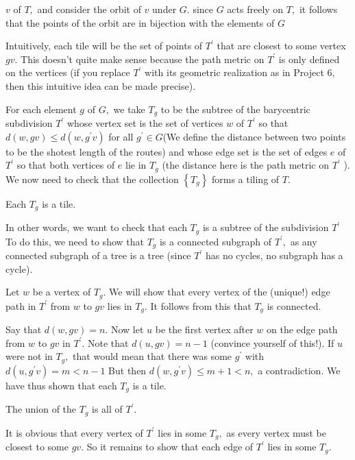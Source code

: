 $v$ of $T,$ and consider the orbit of $v$ under $G .$ since $G$ acts freely on $T,$ it follows that the points of the orbit are in bijection with the elements of $G$
\par
Intuitively, each tile will be the set of points of $T^{\prime}$ that are closest to some vertex
$g v .$ This doesn't quite make sense because the path metric on $T^{\prime}$ is only defined on the vertices (if you replace $T^{\prime}$ with its geometric realization as in Project $6,$ then this intuitive idea can be made precise).
\par
For each element $g$ of $G,$ we take $T_{g}$ to be the subtree of the barycentric subdivision $T^{\prime}$ whose vertex set is the set of vertices $w$ of $T^{\prime}$ so that $d(w, g v) \leq d\left(w, g^{\prime} v\right)$ for all $g^{\prime} \in G$(We define the distance between two points to be the shotest length of the routes) and whose edge set is the set of edges $e$ of $T^{\prime}$ so that both vertices of
$e$ lie in $T_{g}$ (the distance here is the path metric on $T^{\prime}$ ). We now need to check that the collection $\left\{T_{g}\right\}$ forms a tiling of $T$.
\begin{claim}
Each $T_{g}$ is a tile.
\end{claim}
\par
In other words, we want to check that each $T_{g}$ is a subtree of the subdivision $T^{\prime}$ To do this, we need to show that $T_{g}$ is a connected subgraph of $T^{\prime},$ as any connected subgraph of a tree is a tree (since $T^{\prime}$ has no cycles, no subgraph has a cycle).
\par
Let $w$ be a vertex of $T_{g} .$ We will show that every vertex of the (unique!) edge path in $T^{\prime}$ from $w$ to $g v$ lies in $T_{g} .$ It follows from this that $T_{g}$ is connected.
\par
Say that $d(w, g v)=n .$ Now let $u$ be the first vertex after $w$ on the edge path from
$w$ to $g v$ in $T^{\prime} .$ Note that $d(u, g v)=n-1$ (convince yourself of this!). If $u$ were not in $T_{g},$ that would mean that there was some $g^{\prime}$ with $d\left(u, g^{\prime} v\right)=m<n-1$ But then $d\left(w, g^{\prime} v\right) \leq m+1<n,$ a contradiction. We have thus shown that each $T_{g}$ is a tile.
\begin{claim}
The union of the $T_{g}$ is all of $T^{\prime}$.
\end{claim}
It is obvious that every vertex of $T^{\prime}$ lies in some $T_{g},$ as every vertex must be closest to some $g v .$ So it remains to show that each edge of $T^{\prime}$ lies in some $T_{g}$.

